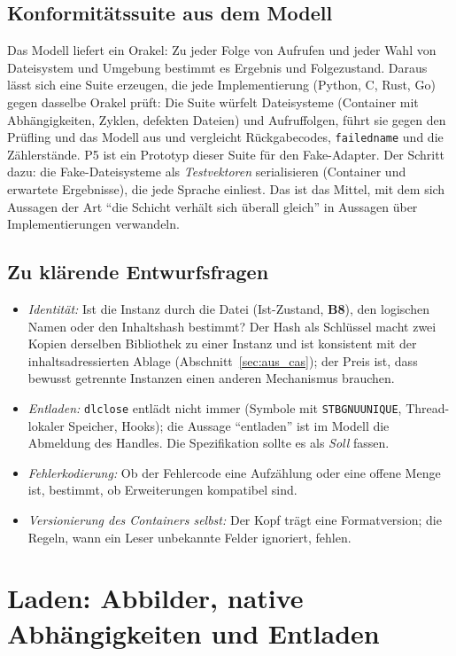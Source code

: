 \documentclass[a4paper,12pt,twoside]{report}
\DeclareRobustCommand{\_}{\ifmmode\mbox{\textunderscore}\else\textunderscore\allowbreak{}\fi}
\theoremstyle{definition}
\newcommand{\Bf}[1]{\textbf{B#1}}
\begin{document}
\subsection{Konformitätssuite aus dem Modell}
Das Modell liefert ein Orakel: Zu jeder Folge von Aufrufen und jeder Wahl von Dateisystem und Umgebung bestimmt es Ergebnis und Folgezustand. Daraus lässt sich eine Suite erzeugen, die jede Implementierung (Python, C, Rust, Go) gegen dasselbe Orakel prüft: Die Suite würfelt Dateisysteme (Container mit Abhängigkeiten, Zyklen, defekten Dateien) und Aufruffolgen, führt sie gegen den Prüfling und das Modell aus und vergleicht Rückgabecodes, \texttt{failed\_name} und die Zählerstände. P5 ist ein Prototyp dieser Suite für den Fake-Adapter. Der Schritt dazu: die Fake-Dateisysteme als \emph{Testvektoren} serialisieren (Container und erwartete Ergebnisse), die jede Sprache einliest. Das ist das Mittel, mit dem sich Aussagen der Art ``die Schicht verhält sich überall gleich'' in Aussagen über Implementierungen verwandeln.

\subsection{Zu klärende Entwurfsfragen}
\begin{itemize}
	\item \emph{Identität:} Ist die Instanz durch die Datei (Ist-Zustand, \Bf{8}), den logischen Namen oder den Inhaltshash bestimmt? Der Hash als Schlüssel macht zwei Kopien derselben Bibliothek zu einer Instanz und ist konsistent mit der inhaltsadressierten Ablage (Abschnitt~\ref{sec:aus_cas}); der Preis ist, dass bewusst getrennte Instanzen einen anderen Mechanismus brauchen.
	\item \emph{Entladen:} \texttt{dlclose} entlädt nicht immer (Symbole mit \texttt{STB\_GNU\_UNIQUE}, Thread-lokaler Speicher, Hooks); die Aussage ``entladen'' ist im Modell die Abmeldung des Handles. Die Spezifikation sollte es als \emph{Soll} fassen.
	\item \emph{Fehlerkodierung:} Ob der Fehlercode eine Aufzählung oder eine offene Menge ist, bestimmt, ob Erweiterungen kompatibel sind.
	\item \emph{Versionierung des Containers selbst:} Der Kopf trägt eine Formatversion; die Regeln, wann ein Leser unbekannte Felder ignoriert, fehlen.
\end{itemize}

\section{Laden: Abbilder, native Abhängigkeiten und Entladen}
\label{sec:aus_laden}
\end{document}

